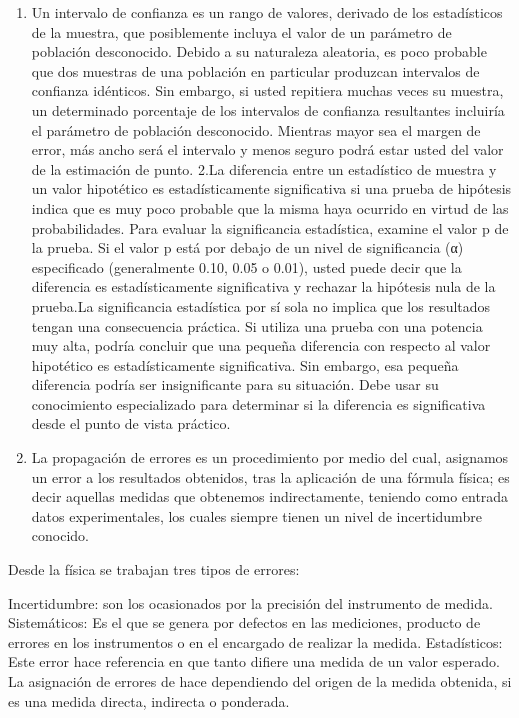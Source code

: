 \documentclass[
]{article}
\providecommand{\tightlist}{%
  \setlength{\itemsep}{0pt}\setlength{\parskip}{0pt}}
\begin{document}
\begin{enumerate}
\def\labelenumi{\arabic{enumi}.}
\tightlist
\item
  Un intervalo de confianza es un rango de valores, derivado de los
  estadísticos de la muestra, que posiblemente incluya el valor de un
  parámetro de población desconocido. Debido a su naturaleza aleatoria,
  es poco probable que dos muestras de una población en particular
  produzcan intervalos de confianza idénticos. Sin embargo, si usted
  repitiera muchas veces su muestra, un determinado porcentaje de los
  intervalos de confianza resultantes incluiría el parámetro de
  población desconocido. Mientras mayor sea el margen de error, más
  ancho será el intervalo y menos seguro podrá estar usted del valor de
  la estimación de punto. 2.La diferencia entre un estadístico de
  muestra y un valor hipotético es estadísticamente significativa si una
  prueba de hipótesis indica que es muy poco probable que la misma haya
  ocurrido en virtud de las probabilidades. Para evaluar la
  significancia estadística, examine el valor p de la prueba. Si el
  valor p está por debajo de un nivel de significancia (α) especificado
  (generalmente 0.10, 0.05 o 0.01), usted puede decir que la diferencia
  es estadísticamente significativa y rechazar la hipótesis nula de la
  prueba.La significancia estadística por sí sola no implica que los
  resultados tengan una consecuencia práctica. Si utiliza una prueba con
  una potencia muy alta, podría concluir que una pequeña diferencia con
  respecto al valor hipotético es estadísticamente significativa. Sin
  embargo, esa pequeña diferencia podría ser insignificante para su
  situación. Debe usar su conocimiento especializado para determinar si
  la diferencia es significativa desde el punto de vista práctico.
\item
  La propagación de errores es un procedimiento por medio del cual,
  asignamos un error a los resultados obtenidos, tras la aplicación de
  una fórmula física; es decir aquellas medidas que obtenemos
  indirectamente, teniendo como entrada datos experimentales, los cuales
  siempre tienen un nivel de incertidumbre conocido.
\end{enumerate}

Desde la física se trabajan tres tipos de errores:

Incertidumbre: son los ocasionados por la precisión del instrumento de
medida. Sistemáticos: Es el que se genera por defectos en las
mediciones, producto de errores en los instrumentos o en el encargado de
realizar la medida. Estadísticos: Este error hace referencia en que
tanto difiere una medida de un valor esperado. La asignación de errores
de hace dependiendo del origen de la medida obtenida, si es una medida
directa, indirecta o ponderada.
\end{document}
